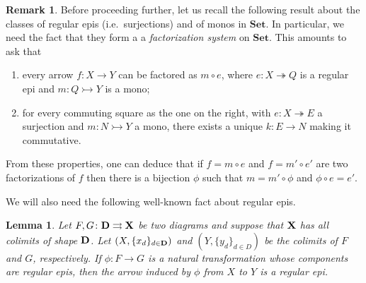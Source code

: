 \documentclass[a4paper,UKenglish,cleveref,pdftex,amsthm,thm-restate,numberwithinsect]{cas-sc}
\theoremstyle{plain}
\newtheorem{lemma}[theorem]{Lemma}
\theoremstyle{definition}
\newtheorem{remark}[theorem]{Remark}
\newcommand{\Set}{\mathbf{Set}}
\def\D{\textbf {\textup{D}}}
\def\X{\textbf {\textup{X}}}
\newcommand{\mto}{\rightarrowtail}
\newcommand{\eto}{\twoheadrightarrow}
\begin{document}
\begin{remark}\label{rem:fact}
	Before proceeding further, let us recall the following result about the classes of regular epis (i.e.~surjections) and of monos in $\Set$. In particular, we need the fact that they form a a \emph{factorization system} \cite{kelly2006note} on $\Set$.  This amounts to ask that
	
	\noindent 
	\parbox{11.5cm}{
	\begin{enumerate} 
		\item every arrow $f\colon X\to Y$ can be factored as $m\circ e$, where $e\colon X\eto Q$ is a regular epi and $m\colon Q\mto Y$ is a mono;
			\item for every commuting square as the one on the right, with $e\colon X\eto E$ a surjection and $m\colon N\mto Y$ a mono, there exists a unique $k\colon E\to N$ making it commutative.
	\end{enumerate}}\hfill \parbox{2cm}{}
	
	\hspace{1pt}\newline 
	From these properties, one can deduce that if $f=m\circ e$ and $f=m'\circ e'$ are two factorizations of $f$ then there is a bijection $\phi$ such that $m=m'\circ \phi$ and $\phi \circ e=e'$.
\end{remark}

We will also need the following well-known fact about regular epis.

\begin{lemma}\label{lemma:nat_trans_reg_epi_canonical_arrow_reg_epi}
	Let $F,G\colon \D\rightrightarrows \X$ be two diagrams and suppose that $\X$ has all colimits of shape $\D$. Let $(X, \{x_d\}_{d \in \D})$ and $(Y, \{y_d\}_{d\in D})$ be the colimits of $F$ and $G$, respectively.  If $\phi\colon  F \to G$ is a natural transformation whose components are regular epis, then the arrow induced by $\phi$ from $X$ to $Y$ is a regular epi.
\end{lemma}

\noindent
\parbox{11.4cm}{
\comp*}\hfill 
\parbox{2cm}{}   
\end{document}

